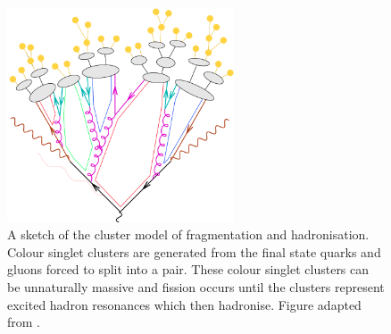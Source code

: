 \begin{figure}[htpb]
	\centering
	\includegraphics[width=0.6\textwidth]{Figures/Generator_Cluster}
	\caption[A sketch of the cluster model of fragmentation and hadronisation. Colour singlet clusters are generated from the final state quarks and gluons forced to split into a \quark{}\antiquark{} pair. These colour singlet clusters can be unnaturally massive and fission occurs until the clusters represent excited hadron resonances which then hadronise. ]{A sketch of the cluster model of fragmentation and hadronisation. Colour singlet clusters are generated from the final state quarks and gluons forced to split into a \quark{}\antiquark{} pair. These colour singlet clusters can be unnaturally massive and fission occurs until the clusters represent excited hadron resonances which then hadronise.  Figure adapted from \cite{Gen:Cluster}.}
	\label{fig:Cluster}
\end{figure}









